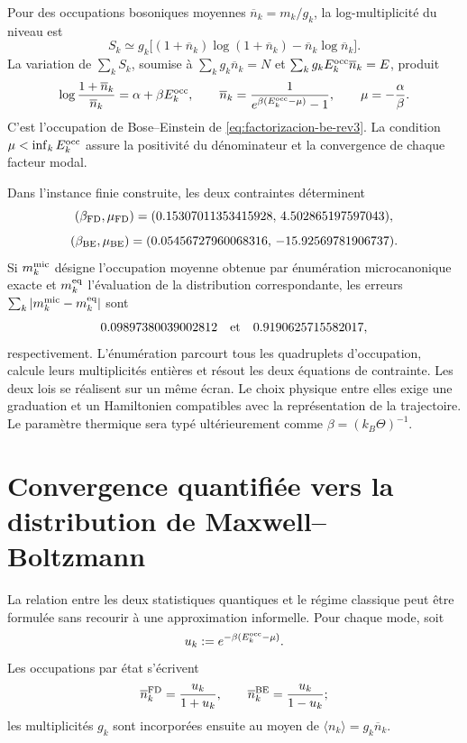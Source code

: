 Pour des occupations bosoniques moyennes
\(\overline n_k=m_k/g_k\), la log-multiplicité du niveau est
\begin{equation}
 S_k\simeq
 g_k\bigl[(1+\overline n_k)\log(1+\overline n_k)
          -\overline n_k\log\overline n_k\bigr].
 \label{eq:entropia-be-nivel-rev3}
\end{equation}
La variation de \(\sum_kS_k\), soumise à
\(\sum_kg_k\overline n_k=N\) et
\(\sum_kg_kE_k^{\rm occ}\overline n_k=E\), produit
\begin{equation}
 \log\frac{1+\overline n_k}{\overline n_k}
 =\alpha+\beta E_k^{\rm occ},
 \qquad
 \overline n_k
 =\frac{1}{e^{\beta(E_k^{\rm occ}-\mu)}-1},
 \qquad
 \mu=-\frac{\alpha}{\beta}.
 \label{eq:variacion-be-rev3}
\end{equation}
C’est l’occupation de Bose--Einstein de
\eqref{eq:factorizacion-be-rev3}. La condition
\(\mu<\inf_kE_k^{\rm occ}\) assure la positivité du dénominateur et la
convergence de chaque facteur modal.

Dans l’instance finie construite, les deux contraintes déterminent
\[
 (\beta_{\rm FD},\mu_{\rm FD})
 =(0.15307011353415928,\,4.502865197597043),
\]
\[
 (\beta_{\rm BE},\mu_{\rm BE})
 =(0.05456727960068316,\,-15.92569781906737).
\]
Si \(m_k^{\rm mic}\) désigne l’occupation moyenne obtenue par énumération
microcanonique exacte et \(m_k^{\rm eq}\) l’évaluation de la distribution
correspondante, les erreurs
\(\sum_k|m_k^{\rm mic}-m_k^{\rm eq}|\) sont
\[
 0.09897380039002812\quad\hbox{et}\quad
 0.9190625715582017,
\]
respectivement. L’énumération parcourt tous les quadruplets d’occupation, calcule leurs multiplicités entières et résout les deux équations de contrainte. Les deux lois se réalisent sur un même écran. Le choix physique entre elles exige une graduation et un Hamiltonien compatibles avec la représentation de la trajectoire. Le paramètre thermique sera typé ultérieurement comme \(\beta=(k_B\Theta)^{-1}\).

\section{Convergence quantifiée vers la distribution de Maxwell--Boltzmann}

La relation entre les deux statistiques quantiques et le régime classique peut
être formulée sans recourir à une approximation informelle. Pour chaque mode, soit
\[
 u_k:=e^{-\beta(E_k^{\rm occ}-\mu)}.
\]
Les occupations par état s’écrivent
\[
 \overline n_k^{\rm FD}=\frac{u_k}{1+u_k},
 \qquad
 \overline n_k^{\rm BE}=\frac{u_k}{1-u_k};
\]
les multiplicités \(g_k\) sont incorporées ensuite au moyen de
\(\langle n_k\rangle=g_k\overline n_k\).

